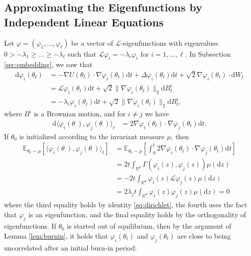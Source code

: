 \documentclass[11pt]{article}
\theoremstyle{plain}
\theoremstyle{definition}
\theoremstyle{remark}
\numberwithin{equation}{section}
\newcommand{\R}{\mathbb{R}}
\renewcommand{\L}{\mathscr{L}}
\renewcommand{\d}{\mathrm{d}}
\newcommand{\lb}{\left}
\newcommand{\rb}{\right}
\newcommand{\E}{\mathbb{E}}
\begin{document}
\subsection{Approximating the Eigenfunctions by Independent Linear Equations}\label{sec:linearapprox}

Let $\varphi=(\varphi_1,\dots,\varphi_\ell)$ be a vector of $\L$-eigenfunctions with eigenvalues $0> -\lambda_1\ge \dots \ge -\lambda_\ell$ such that ${\L \varphi_i=-\lambda_i \varphi_i}$ for $i= 1,\dots,\ell$.
In Subsection \ref{sec:embedding}, we saw that
\begin{equation}\label{eq:varphiSDE}
\begin{aligned}
\d\varphi_i(\theta_t)&=-\nabla U(\theta_t)\cdot \nabla \varphi_i(\theta_t)\d t+\Delta\varphi_i(\theta_t) \d t+\sqrt{2}\nabla \varphi_i(\theta_t) \cdot \d W_t\\
&=\L \varphi_i (\theta_t)\d t+\sqrt{2}\|\nabla \varphi_i(\theta_t)\|_2 \d B^i_t\\
&=-\lambda_i \varphi_i(\theta_t)\d t+\sqrt{2}\|\nabla \varphi_i(\theta_t)\|_2 \d B^i_t,
\end{aligned}
\end{equation}
where $B^i$ is a Brownian motion,
and for $i\neq j$ we have
\begin{align*}
\d\langle\varphi_i(\theta_\cdot),\varphi_j(\theta_\cdot)\rangle _t&=2\nabla \varphi_i(\theta_t)\cdot\nabla\varphi_j(\theta_t) \d t.
\end{align*}
If $\theta_0$ is initialized according to the invariant measure $\mu$, then
\begin{equation}\label{eq:uncorr}
\begin{aligned}
\E_{\theta_0\sim\mu}\lb[\langle\varphi_i(\theta_\cdot),\varphi_j(\theta_\cdot)\rangle _t\rb]&=\E_{\theta_0\sim\mu}\lb[\int_0^t 2\nabla \varphi_i(\theta_t)\cdot\nabla\varphi_j(\theta_t) \d t\rb]\\
&=2t\int_{\R^d} \Gamma(\varphi_i(z),\varphi_j(z))\mu(\d z)\\
&=-2t\int_{\R^d} \varphi_i(z)\L \varphi_j(z)\mu(\d z)\\
&=2\lambda_jt\int_{\R^d} \varphi_i(z) \varphi_j(z)\mu(\d z)=0
\end{aligned}
\end{equation}
where the third equality holds by identity \eqref{eq:dirichlet}, the fourth uses the fact that $\varphi_j$ is an eigenfunction, and the final equality holds by the orthogonality of eigenfunctions.
If $\theta_0$ is started out of equilibrium, then by the argument of Lemma \ref{lem:burnin}, it holds that $\varphi_i(\theta_t)$ and $\varphi_j(\theta_t)$ are close to being uncorrelated after an initial burn-in period:
\end{document}
